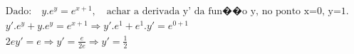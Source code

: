 \begin{ex}
\begin{align}
&\text{Dado:}\quad y.e^{y}=e^{x+1},\quad \text{achar a derivada y' da fun��o y, no ponto x=0, y=1.} \nonumber\\
&y'.e^{y}+y.e^{y}=e^{x+1} \Rightarrow y'.e^1+e^1.y'=e^{0+1}\nonumber\\
&2ey'=e \Rightarrow y'=\frac{e}{2e} \Rightarrow y'=\frac{1}{2}\nonumber
\end{align}
\end{ex}